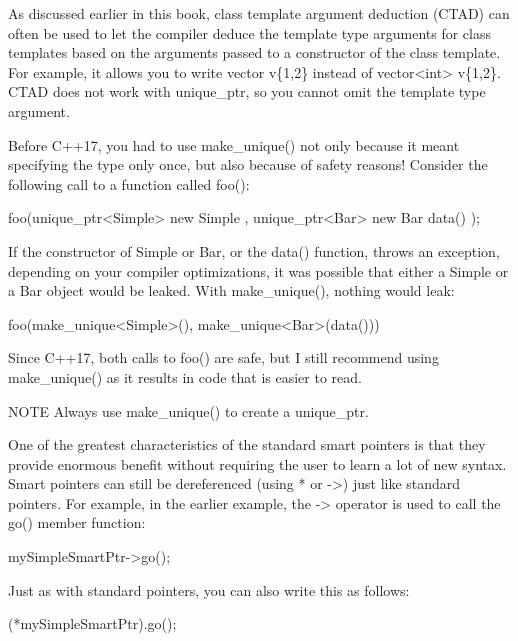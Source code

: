 As discussed earlier in this book, class template argument deduction (CTAD) can often be used to let the compiler deduce the template type arguments for class templates based on the arguments passed to a constructor of the class template. For example, it allows you to write vector v\{1,2\} instead of vector<int> v\{1,2\}. CTAD does not work with unique\_ptr, so you cannot omit the template type argument.

Before C++17, you had to use make\_unique() not only because it meant specifying the type only once, but also because of safety reasons! Consider the following call to a function called foo():

\begin{cpp}
foo(unique_ptr<Simple> { new Simple{} }, unique_ptr<Bar> { new Bar { data() } });
\end{cpp}

If the constructor of Simple or Bar, or the data() function, throws an exception, depending on your compiler optimizations, it was possible that either a Simple or a Bar object would be leaked. With make\_unique(), nothing would leak:

\begin{cpp}
foo(make_unique<Simple>(), make_unique<Bar>(data()))
\end{cpp}

Since C++17, both calls to foo() are safe, but I still recommend using make\_unique() as it results in code that is easier to read.

\begin{myNotic}{NOTE}
Always use make\_unique() to create a unique\_ptr.
\end{myNotic}


One of the greatest characteristics of the standard smart pointers is that they provide enormous benefit without requiring the user to learn a lot of new syntax. Smart pointers can still be dereferenced (using * or ->) just like standard pointers. For example, in the earlier example, the -> operator is used to call the go() member function:

\begin{cpp}
mySimpleSmartPtr->go();
\end{cpp}

Just as with standard pointers, you can also write this as follows:

\begin{cpp}
(*mySimpleSmartPtr).go();
\end{cpp}

